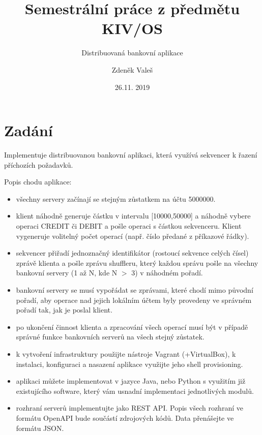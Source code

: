 \documentclass[11pt,a4paper]{scrartcl}
\begin{document}
	\title{Semestrální práce z předmětu KIV/OS}
	\subtitle{Distribuovaná bankovní aplikace}
	\author{Zdeněk Valeš}
	\date{26.11. 2019}
	\maketitle
	\newpage
	
	\section{Zadání}
	Implementuje distribuovanou bankovní aplikaci, která využívá sekvencer k řazení příchozích požadavků.
	
	Popis chodu aplikace:
	
	\begin{itemize}
		\item všechny servery začínají se stejným zůstatkem na účtu 5000000.
		
		\item klient náhodně generuje částku v intervalu [10000,50000] a náhodně vybere operaci CREDIT či DEBIT a pošle operaci s částkou sekvenceru. Klient vygeneruje volitelný počet operací (např. číslo předané z příkazové řádky).
		
		\item sekvencer přiřadí jednoznačný identifikátor (rostoucí sekvence celých čísel) zprávě klienta a pošle zprávu shuffleru, který každou správu pošle na všechny bankovní servery (1 až N, kde N $>$ 3) v náhodném pořadí.
		
		\item bankovní servery se musí vypořádat se zprávami, které chodí mimo původní pořadí, aby operace nad jejich lokálním účtem byly provedeny ve správném pořadí tak, jak je poslal klient.
		
		\item po ukončení činnost klienta a zpracování všech operací musí být v případě správné funkce bankovních serverů na všech stejný zůstatek.
		
		\item k vytvoření infrastruktury použijte nástroje Vagrant (+VirtualBox), k instalaci, konfiguraci a nasazení aplikace využijte jeho shell provisioning.
		
		\item aplikaci můžete implementovat v jazyce Java, nebo Python s využitím již existujícího software, který vám usnadní implementaci jednotlivých modulů.
		
		\item rozhraní serverů implementujte jako REST API. Popis všech rozhraní ve formátu OpenAPI bude součástí zdrojových kódů. Data přenášejte ve formátu JSON.
	\end{itemize}
	
\end{document}
